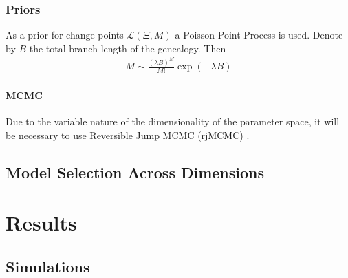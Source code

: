\documentclass{report}
\theoremstyle{definition}
\begin{document}
\subsection{Priors}
As a prior for change points $\mathcal{L}(\Xi,M)$ a Poisson Point Process is used. Denote by $B$ the total branch length of the genealogy. Then
\begin{gather}
M\sim\frac{(\lambda B)^M}{M!}\exp(-\lambda B)
\end{gather}
\subsubsection{MCMC}
Due to the variable nature of the dimensionality of the parameter space, it will be necessary to use Reversible Jump MCMC (rjMCMC) \cite{fan_reversible_2010,green_reversible_1995}.
\section{Model Selection Across Dimensions}%
\chapter{Results}
\section{Simulations}
\end{document}
